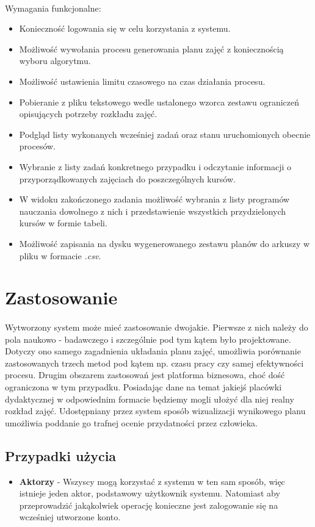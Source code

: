 \paragraph{}Wymagania funkcjonalne:
\begin{itemize}
\item Konieczność logowania się w celu korzystania z systemu.
\item Możliwość wywołania procesu generowania planu zajęć z koniecznością wyboru algorytmu.
\item Możliwość ustawienia limitu czasowego na czas działania procesu.
\item Pobieranie z pliku tekstowego wedle ustalonego wzorca zestawu ograniczeń opisujących potrzeby rozkładu zajęć.
\item Podgląd listy wykonanych wcześniej zadań oraz stanu uruchomionych obecnie procesów.
\item Wybranie z listy zadań konkretnego przypadku i odczytanie informacji o przyporządkowanych zajęciach do poszczególnych kursów.
\item W widoku zakończonego zadania możliwość wybrania z listy programów nauczania dowolnego z nich i przedstawienie wszystkich przydzielonych kursów w formie tabeli.
\item Możliwość zapisania na dysku wygenerowanego zestawu planów do arkuszy w pliku w formacie \emph{.csv}.
\end{itemize}
\section{Zastosowanie}
\paragraph{}Wytworzony system może mieć zastosowanie dwojakie. Pierwsze z nich należy do pola naukowo - badawczego i szczególnie pod tym kątem było projektowane. Dotyczy ono samego zagadnienia układania planu zajęć, umożliwia porównanie zastosowanych trzech metod pod kątem np. czasu pracy czy samej efektywności procesu. Drugim obszarem zastosowań jest platforma biznesowa, choć dość ograniczona w tym przypadku. Posiadając dane na temat jakiejś placówki dydaktycznej w odpowiednim formacie będziemy mogli ułożyć dla niej realny rozkład zajęć. Udostępniany przez system sposób wizualizacji wynikowego planu umożliwia poddanie go trafnej ocenie przydatności przez człowieka.
\subsection{Przypadki użycia}
\begin{itemize}
\item{\textbf{Aktorzy}} - Wszyscy mogą korzystać z systemu w ten sam sposób, więc istnieje jeden aktor, podstawowy użytkownik systemu. Natomiast aby przeprowadzić jakąkolwiek operację konieczne jest zalogowanie się na wcześniej utworzone konto.
\end{itemize}
